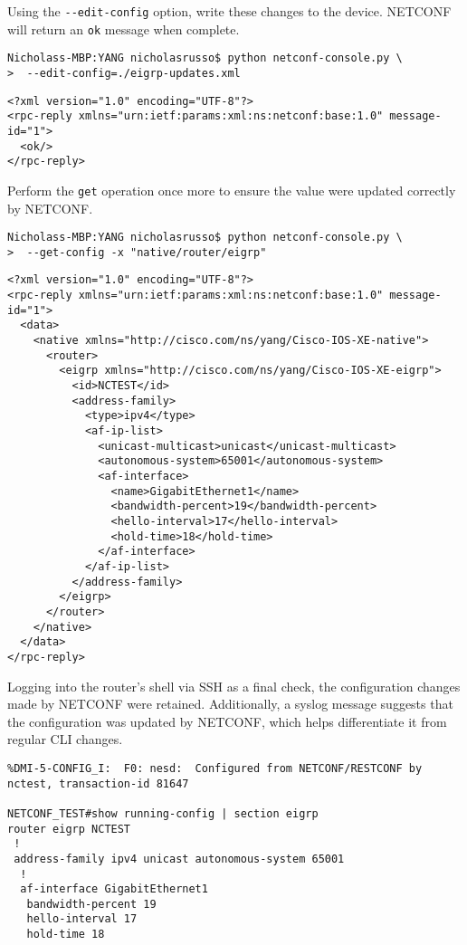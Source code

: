 Using the \verb|--edit-config| option, write these changes to the device. NETCONF
will return an \verb|ok| message when complete.

\begin{verbatim}
Nicholass-MBP:YANG nicholasrusso$ python netconf-console.py \
>  --edit-config=./eigrp-updates.xml
\end{verbatim}

\begin{verbatim}
<?xml version="1.0" encoding="UTF-8"?>
<rpc-reply xmlns="urn:ietf:params:xml:ns:netconf:base:1.0" message-id="1">
  <ok/>
</rpc-reply>
\end{verbatim}

Perform the \verb|get| operation once more to ensure the value were updated
correctly by NETCONF\@.
 
\begin{verbatim}
Nicholass-MBP:YANG nicholasrusso$ python netconf-console.py \
>  --get-config -x "native/router/eigrp"
\end{verbatim}

\begin{verbatim}
<?xml version="1.0" encoding="UTF-8"?>
<rpc-reply xmlns="urn:ietf:params:xml:ns:netconf:base:1.0" message-id="1">
  <data>
    <native xmlns="http://cisco.com/ns/yang/Cisco-IOS-XE-native">
      <router>
        <eigrp xmlns="http://cisco.com/ns/yang/Cisco-IOS-XE-eigrp">
          <id>NCTEST</id>
          <address-family>
            <type>ipv4</type>
            <af-ip-list>
              <unicast-multicast>unicast</unicast-multicast>
              <autonomous-system>65001</autonomous-system>
              <af-interface>
                <name>GigabitEthernet1</name>
                <bandwidth-percent>19</bandwidth-percent>
                <hello-interval>17</hello-interval>
                <hold-time>18</hold-time>
              </af-interface>
            </af-ip-list>
          </address-family>
        </eigrp>
      </router>
    </native>
  </data>
</rpc-reply>
\end{verbatim}

Logging into the router's shell via SSH as a final check, the configuration
changes made by NETCONF were retained. Additionally, a syslog message suggests
that the configuration was updated by NETCONF, which helps differentiate it
from regular CLI changes.

\begin{verbatim}
%DMI-5-CONFIG_I:  F0: nesd:  Configured from NETCONF/RESTCONF by nctest, transaction-id 81647

NETCONF_TEST#show running-config | section eigrp
router eigrp NCTEST
 !
 address-family ipv4 unicast autonomous-system 65001
  !
  af-interface GigabitEthernet1
   bandwidth-percent 19
   hello-interval 17
   hold-time 18
\end{verbatim}

